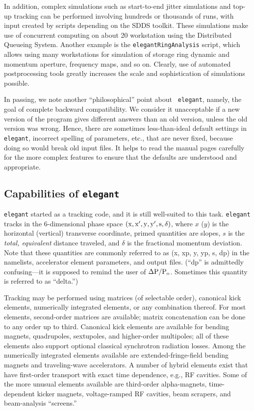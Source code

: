 \documentclass[11pt]{article}
\begin{document}
In addition, complex simulations such as start-to-end jitter
simulations\cite{S2EJitter} and top-up tracking\cite{TopUpTracking}
can be performed involving hundreds or thousands of runs, with input
created by scripts depending on the SDDS toolkit.  These simulations
make use of concurrent computing on about 20 workstation using the
Distributed Queueing System\cite{DQS}.  Another example is the {\tt elegantRingAnalysis} 
script, which allows using many workstations for simulation of storage ring
dynamic and momentum aperture, frequency maps, and so on.
Clearly, use of automated
postprocessing tools greatly increases the scale and sophistication of
simulations possible.  

In passing, we note another ``philosophical'' point about {\tt
elegant}, namely, the goal of complete backward compatibility.  We
consider it unacceptable if a new version of the program gives
different answers than an old version, unless the old version was
wrong.  Hence, there are sometimes less-than-ideal default settings in
{\tt elegant}, incorrect spelling of parameters, etc., that are never
fixed, because doing so would break old input files.  It helps to read
the manual pages carefully for the more complex features to ensure that
the defaults are understood and appropriate.

\subsection{Capabilities of {\tt elegant}}

{\tt elegant} started as a tracking code, and it is still well-suited
to this task.  {\tt elegant} tracks in the 6-dimensional phase space
${\rm (x, x^\prime, y, y^\prime, s, \delta)}$, where $x$ ($y$) is the
horizontal (vertical) transverse coordinate, primed quantities are
slopes, $s$ is the {\em total, equivalent} distance traveled, and $\delta$ is the
fractional momentum deviation\cite{KLBrown}.  Note that these
quantities are commonly referred to as (x, xp, y, yp, s, dp) in the
namelists, accelerator element parameters, and output files.  (``dp''
is admittedly confusing---it is supposed to remind the user of ${\rm
\Delta P/P_o}$.  Sometimes this quantity is referred to as ``delta.'')

Tracking may be performed using matrices (of selectable order),
canonical kick elements, numerically integrated elements, or any
combination thereof.  For most elements, second-order matrices are
available; matrix concatenation can be done to any order up to third.
Canonical kick elements are available for bending magnets,
quadrupoles, sextupoles, and higher-order multipoles; all of these
elements also support optional classical synchrotron radiation losses.
Among the numerically integrated elements available are
extended-fringe-field bending magnets and traveling-wave accelerators.
A number of hybrid elements exist that have first-order transport with
exact time dependence, e.g., RF cavities.    Some of the more unusual
elements available are third-order
alpha-magnets\cite{Enge,Borland_thesis}, time-dependent kicker
magnets, voltage-ramped RF cavities, beam scrapers, and beam-analysis
``screens.''
\end{document}
